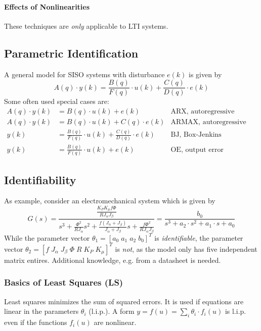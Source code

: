 \paragraph{Effects of Nonlinearities}
These techniques are \emph{only} applicable to LTI systems.

\subsection{Parametric Identification}
A general model for SISO systems with disturbance $e(k)$ is given by
\[
    A(q) \cdot y(k) = \frac{B(q)}{F(q)} \cdot u(k) + \frac{C(q)}{D(q)}\cdot e(k)
\]
Some often used special cases are:
\begin{align*}
    A(q) \cdot y(k) &= B(q) \cdot u(k) + e(k) & \text{ARX, autoregressive} \\
    A(q) \cdot y(k) &= B(q) \cdot u(k) + C(q) \cdot e(k) & \text{ARMAX, autoregressive moving average} \\
    y(k) &= \frac{B(q)}{F(q)} \cdot u(k) + \frac{C(q)}{D(q)} \cdot e(k) & \text{BJ, Box-Jenkins} \\
    y(k) &= \frac{B(q)}{F(q)} \cdot u(k) + e(k) & \text{OE, output error}
\end{align*}

\subsection{Identifiability}
As example, consider an electromechanical system which is given by
\[
    G(s) = \frac{\frac{K_P K_{\mu} f \Phi}{R J_{\alpha} J_{\beta}}}
    {s^3 + \frac{\Phi^2}{R J_{\alpha}} s^2 + \frac{f(J_{\alpha}+J_{\beta})}{J_{\alpha}+J_{\beta}}s + \frac{f \Phi^2}{R J_{\alpha} J_{\beta}}}
    =
    \frac{b_0}{s^3 + a_2 \cdot s^2 + a_1 \cdot s + a_0}
\]
While the parameter vector $\theta_1 = [a_0 \; a_1 \; a_2 \; b_0]^T$
is \emph{identifiable}, the parameter vector
$\theta_2 = [f \; J_{\alpha} \; J_{\beta} \; \Phi \; R \; K_P \; K_{\mu}]^T$
is \emph{not}, as the model only has five independent matrix entires.
Additional knowledge, e.g. from a datasheet is needed.

\subsubsection{Basics of Least Squares (LS)}
Least squares minimizes the sum of squared errors.
It is used if equations are linear in the parameters $\theta_i$ (l.i.p.).
A form $y = f(u) = \sum_i \theta_i \cdot f_i(u)$ is l.i.p. even if the functions
$f_i(u)$ are nonlinear.

